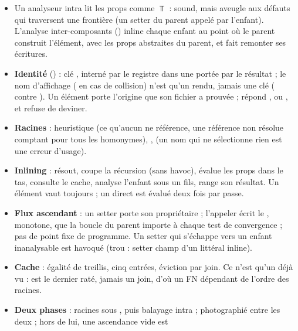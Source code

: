 \begin{resume}
\begin{itemize}
  \item Un analyseur intra lit les props comme $\Top$ : sound, mais aveugle aux défauts qui
        traversent une frontière (un setter du parent appelé par l'enfant). L'analyse
        inter-composants () inline chaque enfant au point où le parent construit
        l'élément, avec les props abstraites du parent, et fait remonter ses écritures.
  \item \textbf{Identité} () : clé ,  interné par
        le registre dans une  portée par le résultat ; le nom d'affichage
        ( en cas de collision) n'est qu'un rendu, jamais une clé
        ( contre ). Un élément porte
        l'origine que son fichier a prouvée ;  répond ,
         ou , et refuse de deviner.
  \item \textbf{Racines} : heuristique (ce qu'aucun  ne référence, une référence
        non résolue comptant pour tous les homonymes), , 
        (un nom qui ne sélectionne rien est une erreur d'usage).
  \item \textbf{Inlining} :  résout, coupe la récursion (sans havoc),
        évalue les props dans le tas, consulte le cache, analyse l'enfant sous un
         fils, range son résultat. Un élément vaut toujours  ; un
         direct est évalué deux fois par passe.
  \item \textbf{Flux ascendant} : un setter porte son propriétaire ; l'appeler écrit le
        , monotone, que la boucle du parent importe à chaque test de
        convergence ; pas de point fixe de programme. Un setter qui s'échappe vers un enfant
        inanalysable est havoqué (trou : setter champ d'un littéral inline).
  \item \textbf{Cache} : égalité de treillis, cinq entrées, éviction par join. Ce n'est qu'un
        \og déjà vu\fg{} :  est le dernier raté, jamais un join, d'où un FN
        dépendant de l'ordre des racines.
  \item \textbf{Deux phases} : racines sous , puis balayage intra ;
         photographié entre les deux ; hors de lui, une ascendance vide est

\end{itemize}
\end{resume}
